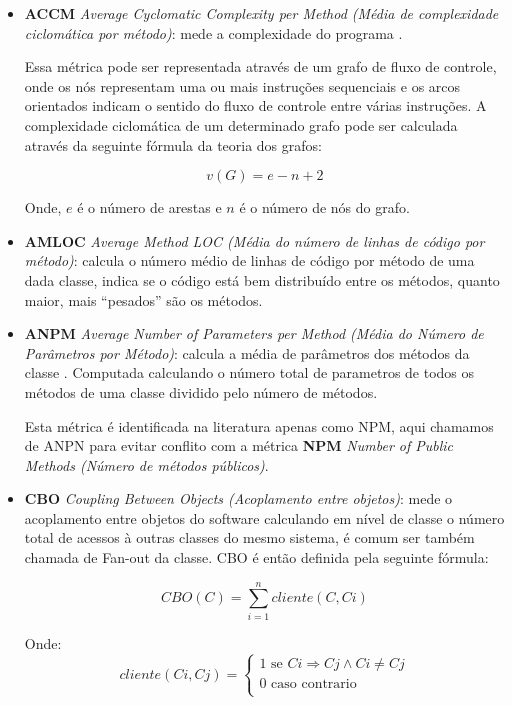\begin{itemize}
  \item {\bf ACCM} {\it Average Cyclomatic Complexity per Method (Média de
    complexidade ciclomática por método)}: mede a complexidade do programa
    \cite{McCabe1976}.

Essa métrica pode ser representada através de um grafo de fluxo de controle,
onde os nós representam uma ou mais instruções sequenciais e os arcos
orientados indicam o sentido do fluxo de controle entre várias instruções. A
complexidade ciclomática de um determinado grafo pode ser calculada através da
seguinte fórmula da teoria dos grafos:

\[ v(G) = e - n + 2 \]

Onde, $e$ é o número de arestas e $n$ é o número de nós do grafo.


  \item {\bf AMLOC} {\it Average Method LOC (Média do número de linhas de
    código por método)}: calcula o número médio de linhas de código por método
    de uma dada classe, indica se o código está bem distribuído entre os
    métodos, quanto maior, mais ``pesados'' são os métodos.

  \item {\bf ANPM} {\it Average Number of Parameters per Method (Média do
    Número de Parâmetros por Método)}: calcula a média de parâmetros dos
    métodos da classe \cite{Jagdish1997}. Computada calculando o número
    total de parametros de todos os métodos de uma classe dividido pelo número
    de métodos.

    Esta métrica é identificada na literatura apenas como NPM, aqui chamamos de
    ANPN para evitar conflito com a métrica {\bf NPM} {\it Number of Public
    Methods (Número de métodos públicos)}.

  \item {\bf CBO} {\it Coupling Between Objects (Acoplamento entre objetos)}:
    mede o acoplamento entre objetos do software \cite{Chidamber1994}
    calculando em nível de classe o número total de acessos à outras classes do
    mesmo sistema, é comum ser também chamada de Fan-out da classe. CBO é então
    definida pela seguinte fórmula:

\[ CBO(C) = \sum_{i=1}^{n} cliente(C, Ci) \]

Onde:
\[ cliente(Ci, Cj) =
  \begin{cases}
    1 \text{ se } Ci \Rightarrow Cj \wedge Ci \neq Cj \\
    0 \text{ caso contrario} \\
  \end{cases}
\]


\end{itemize}
